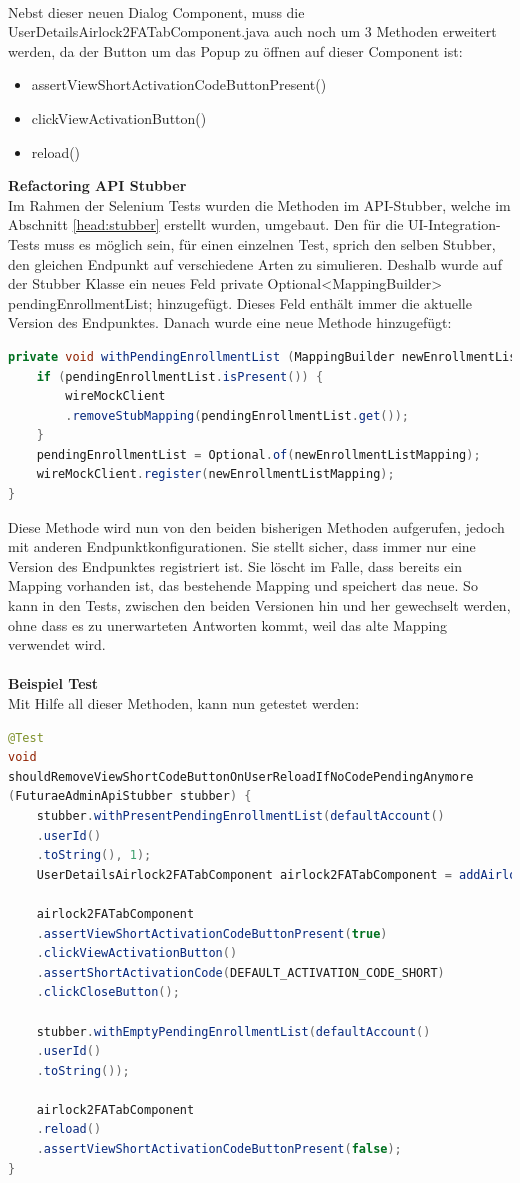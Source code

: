 \\
Nebst dieser neuen Dialog Component, muss die UserDetailsAirlock2FATabComponent.java auch noch um 3 Methoden erweitert werden, da der Button um das Popup zu öffnen auf dieser Component ist:
\begin{itemize}
	\item assertViewShortActivationCodeButtonPresent()
	\item clickViewActivationButton()
	\item reload()
\end{itemize}
\textbf{Refactoring API Stubber}\\
Im Rahmen der Selenium Tests wurden die Methoden im API-Stubber, welche im Abschnitt \ref{head:stubber} erstellt wurden, umgebaut. Den für die UI-Integration-Tests muss es möglich sein, für einen einzelnen Test, sprich den selben Stubber, den gleichen Endpunkt auf verschiedene Arten zu simulieren. Deshalb wurde auf der Stubber Klasse ein neues Feld \flqq private Optional<MappingBuilder> pendingEnrollmentList; \frqq{} hinzugefügt. Dieses Feld enthält immer die aktuelle Version des Endpunktes. Danach wurde eine neue Methode hinzugefügt: 
\begin{lstlisting}[language=Java]
private void withPendingEnrollmentList (MappingBuilder newEnrollmentListMapping) {
	if (pendingEnrollmentList.isPresent()) {
		wireMockClient
		.removeStubMapping(pendingEnrollmentList.get());
	}
	pendingEnrollmentList = Optional.of(newEnrollmentListMapping);
	wireMockClient.register(newEnrollmentListMapping);
}
\end{lstlisting}
Diese Methode wird nun von den beiden bisherigen Methoden aufgerufen, jedoch mit anderen Endpunktkonfigurationen. Sie stellt sicher, dass immer nur eine Version des Endpunktes registriert ist. Sie löscht im Falle, dass bereits ein Mapping vorhanden ist, das bestehende Mapping und speichert das neue. So kann in den Tests, zwischen den beiden Versionen hin und her gewechselt werden, ohne dass es zu unerwarteten Antworten kommt, weil das alte Mapping verwendet wird.
\\
\\
\textbf{Beispiel Test}\\
Mit Hilfe all dieser Methoden, kann nun getestet werden:
\begin{lstlisting}[language=Java]
@Test
void 
shouldRemoveViewShortCodeButtonOnUserReloadIfNoCodePendingAnymore 
(FuturaeAdminApiStubber stubber) {
	stubber.withPresentPendingEnrollmentList(defaultAccount()
	.userId()
	.toString(), 1);
	UserDetailsAirlock2FATabComponent airlock2FATabComponent = addAirlock2FA();
	
	airlock2FATabComponent
	.assertViewShortActivationCodeButtonPresent(true)
	.clickViewActivationButton()
	.assertShortActivationCode(DEFAULT_ACTIVATION_CODE_SHORT)
	.clickCloseButton();
	
	stubber.withEmptyPendingEnrollmentList(defaultAccount()
	.userId()
	.toString());
	
	airlock2FATabComponent
	.reload()
	.assertViewShortActivationCodeButtonPresent(false);
}
\end{lstlisting}
